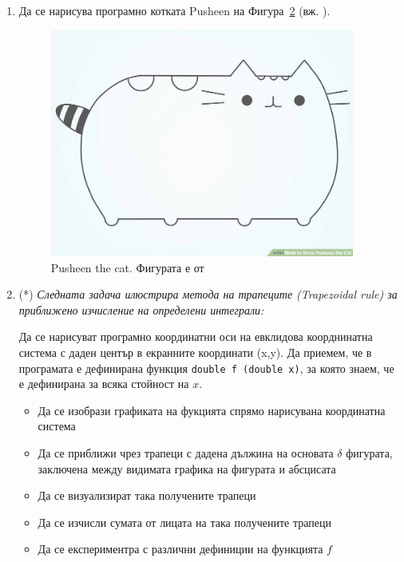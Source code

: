 \documentclass[12pt,a4paper]{article}
\newcommand{\code}[1]{\texttt{#1}}
\begin{document}
{\begin{enumerate}[resume]
\begin{figure}
      \caption{Рисуване на петоъгълник чрез намиране на 5 равноотдалечени точки по окръжността с радиус $r$ и център $(x_0,y_0)$}
      \label{fig:pentagon}
    \end{figure}




	\item Да се нарисува програмно котката Pusheen на Фигура~\ref{fig:pusheen} (вж. \cite{pusheen}).

  \begin{figure}
  \centering
	\includegraphics[width=10cm]{images/pusheen}
  \caption {Pusheen the cat. Фигурата е от \cite{pusheen}}
  \label{fig:pusheen}
  \end{figure}


  \item(*) \textit{Следната задача илюстрира метода на трапеците (Trapezoidal rule) за приближено изчисление на определени интеграли:}

	Да се нарисуват програмно координатни оси на евклидова коорднинатна система с даден център в екранните координати (x,y). Да приемем, че в програмата е дефинирана функция \code {double f (double x)}, за която знаем, че е дефинирана за всяка стойност на $x$.

	\begin{itemize}
		\item Да се изобрази графиката на фукцията спрямо нарисувана координатна система
		\item Да се приближи чрез трапеци с дадена дължина на основата $\delta$ фигурата, заключена между видимата графика на фигурата и абсцисата
		\item Да се визуализират така получените трапеци
		\item Да се изчисли сумата от лицата на така получените трапеци
		\item Да се експериментра с различни дефиниции на функцията $f$
	\end{itemize}



\end{enumerate}}
\end{document}
